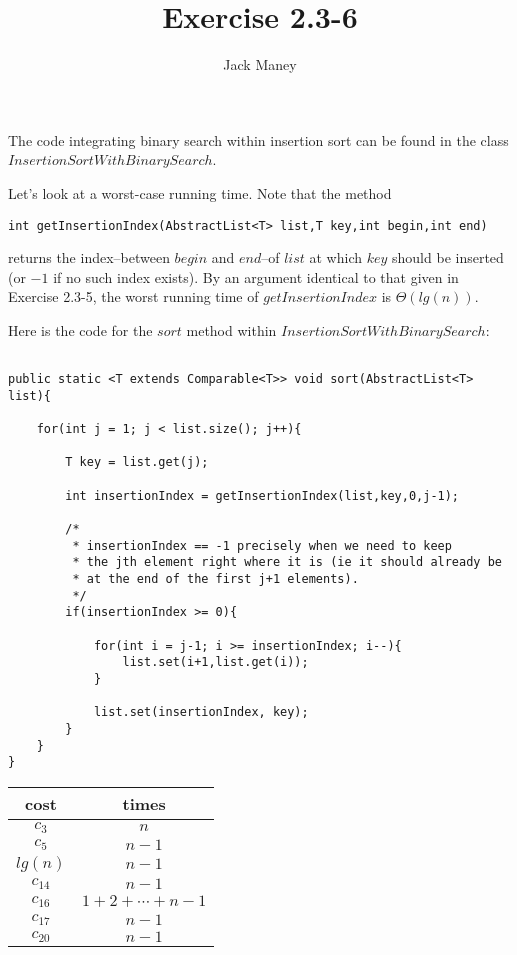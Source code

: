 \documentclass{article}
\begin{document}
\title{Exercise 2.3-6}
\author{Jack Maney}
\maketitle

The code integrating binary search within insertion sort can be found in the class $InsertionSortWithBinarySearch$. 

Let's look at a worst-case running time. Note that the method

\begin{verbatim}
int getInsertionIndex(AbstractList<T> list,T key,int begin,int end)
\end{verbatim}

\noindent returns the index--between $begin$ and $end$--of $list$ at which $key$ should be inserted (or $-1$ if no such index exists). By an argument identical to that given in Exercise 2.3-5, the worst running time of $getInsertionIndex$ is $\Theta(lg(n))$.

Here is the code for the $sort$ method within $InsertionSortWithBinarySearch$:

\begin{verbatim}

public static <T extends Comparable<T>> void sort(AbstractList<T> list){
		
	for(int j = 1; j < list.size(); j++){
			
		T key = list.get(j);
		
		int insertionIndex = getInsertionIndex(list,key,0,j-1);
			
		/*
		 * insertionIndex == -1 precisely when we need to keep 
		 * the jth element right where it is (ie it should already be
		 * at the end of the first j+1 elements).
		 */
		if(insertionIndex >= 0){
			
			for(int i = j-1; i >= insertionIndex; i--){
				list.set(i+1,list.get(i));
			}
			
			list.set(insertionIndex, key);
		}
	}
}

\end{verbatim}


\bigskip

\begin{tabular}{|c|c|}
\hline 
cost & times \\ 
\hline 
$c_3$ & $n$ \\ 
\hline 
$c_5$ & $n-1$ \\ 
\hline 
$lg(n)$ & $n-1$ \\ 
\hline 
$c_{14}$ & $n-1$ \\ 
\hline 
$c_{16}$ & $1 + 2 + \cdots + n-1$ \\ 
\hline 
$c_{17}$ & $n-1$ \\ 
\hline 
$c_{20}$ & $n-1$ \\ 
\hline 
\end{tabular} 
\end{document}
